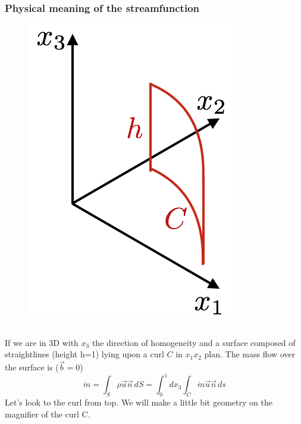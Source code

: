 		\newpage
		\subsubsection{Physical meaning of the streamfunction}
			\begin{figure}
			\vspace{-5mm}
			\includegraphics[scale=0.4]{ch1/13}
			\label{fig:1.13}
			\end{figure}
			If we are in 3D with $x_3$ the direction of homogeneity and a surface composed of straightlines (height h=1) lying upon a curl $C$ in $x_1 x_2$ plan. The mass flow over the surface is ($\vec{b} = 0$)
			\begin{equation}
				\dot{m} = \int _S \rho \vec{u}\vec{n}\, dS = \int _0 ^1 dx_3 \int _C \dot{m}\vec{u}\vec{n}\, ds
				\label{eq:108}
			\end{equation}
		Let's look to the curl from top. We will make a little bit geometry on the magnifier of the curl C. \\
		
